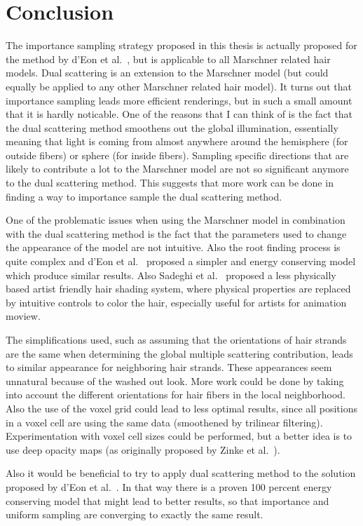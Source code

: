 \documentclass[11pt,a4paper]{report}
\begin{document}
\chapter{Conclusion}

The importance sampling strategy proposed in this thesis is actually proposed for the method by d'Eon et al.~\cite{2011}, but is applicable to all Marschner related hair models. Dual scattering is an extension to the Marschner model (but could equally be applied to any other Marschner related hair model). It turns out that importance sampling leads more efficient renderings, but in such a small amount that it is hardly noticable. One of the reasons that I can think of is the fact that the dual scattering method smoothens out the global illumination, essentially meaning that light is coming from almost anywhere around the hemisphere (for outside fibers) or sphere (for inside fibers). Sampling specific directions that are likely to contribute a lot to the Marschner model are not so significant anymore to the dual scattering method. This suggests that more work can be done in finding a way to importance sample the dual scattering method.

One of the problematic issues when using the Marschner model in combination with the dual scattering method is the fact that the parameters used to change the appearance of the model are not intuitive. Also the root finding process is quite complex and d'Eon et al.~\cite{deon2011} proposed a simpler and energy conserving model which produce similar results. Also Sadeghi et al.~\cite{sadeghi2010} proposed a less physically based artist friendly hair shading system, where physical properties are replaced by intuitive controls to color the hair, especially useful for artists for animation moview.

The simplifications used, such as assuming that the orientations of hair strands are the same when determining the global multiple scattering contribution, leads to similar appearance for neighboring hair strands. These appearances seem unnatural because of the washed out look. More work could be done by taking into account the different orientations for hair fibers in the local neighborhood. Also the use of the voxel grid could lead to less optimal results, since all positions in a voxel cell are using the same data (smoothened by trilinear filtering). Experimentation with voxel cell sizes could be performed, but a better idea is to use deep opacity maps (as originally proposed by Zinke et al.~\cite{zinke}).

Also it would be beneficial to try to apply dual scattering method to the solution proposed by d'Eon et al.~\cite{eon2011}. In that way there is a proven 100 percent energy conserving model that might lead to better results, so that importance and uniform sampling are converging to exactly the same result.





\end{document}
